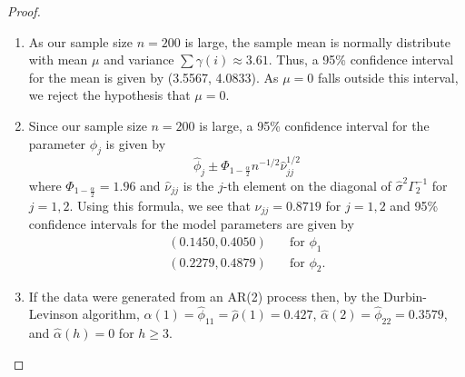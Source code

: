 \documentclass[12pt]{article}
\theoremstyle{definition}
\begin{document}
\begin{proof}
\begin{enumerate}
    \item As our sample size $n=200$ is large, the sample mean is normally distribute with mean $\mu$ and
      variance $\sum \gamma(i) \approx 3.61$. Thus, a 95\% confidence interval for the mean
      is given by (3.5567, 4.0833). As $\mu = 0$ falls outside this interval, we reject the
      hypothesis that $\mu = 0$.
    \item   Since our sample size $n=200$ is large, a 95\% confidence interval for the parameter $\phi_j$ is given by
      \[
        \hat{\phi}_j \pm \Phi_{1-\frac{\alpha}{2}}n ^{-1/2} \hat{\nu}_{jj}^{1/2}
      \]
      where $\Phi_{1-\frac{\alpha}{2}} = 1.96$ and $\hat{\nu}_{jj}$ is the $j$-th element on the diagonal of
      $\hat{\sigma}^2\Gamma_2^{-1}$ for $j=1,2$. Using this formula, we see that
      $\nu_{jj} = 0.8719$ for $j=1,2$ and 95\% confidence intervals for the model
      parameters are given by
      \begin{align*}
        (0.1450, 0.4050)& \quad \text{for $\phi_1$} \\
        (0.2279, 0.4879)& \quad \text{for $\phi_2$}.
      \end{align*}
    \item If the data were generated from an AR(2) process then, by the Durbin-Levinson algorithm,
      $\hat{\alpha}(1) = \hat{\phi}_{11} = \hat{\rho}(1) = 0.427$,
      $\hat{\alpha}(2) = \hat{\phi}_{22} = 0.3579$, and
      $\hat{\alpha}(h) = 0 $ for $h \geq 3$.
  \end{enumerate}
\end{proof}
\end{document}
